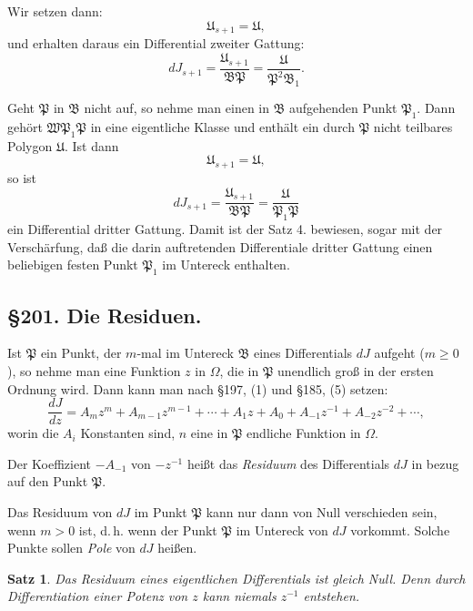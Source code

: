 \documentclass[12pt,a4paper]{article}
\newtheorem*{satz}{Satz}
\begin{document}
Wir setzen dann:
\[
\mathfrak{U}_{s+1} = \mathfrak{U},
\]
und erhalten daraus ein Differential zweiter Gattung:
\begin{equation}\label{eq:200-9}
dJ_{s+1} = \frac{\mathfrak{U}_{s+1}}{\mathfrak{B}\mathfrak{P}} = \frac{\mathfrak{U}}{\mathfrak{P}^2 \mathfrak{B}_1}.
\end{equation}

Geht $\mathfrak{P}$ in $\mathfrak{B}$ nicht auf, so nehme man einen in $\mathfrak{B}$ aufgehenden Punkt $\mathfrak{P}_1$. Dann gehört $\mathfrak{W}\mathfrak{P}_1\mathfrak{P}$ in eine eigentliche Klasse und enthält ein durch $\mathfrak{P}$ nicht teilbares Polygon $\mathfrak{U}$. Ist dann
\[
\mathfrak{U}_{s+1} = \mathfrak{U},
\]
so ist
\begin{equation}\label{eq:200-10}
dJ_{s+1} = \frac{\mathfrak{U}_{s+1}}{\mathfrak{B}\mathfrak{P}} = \frac{\mathfrak{U}}{\mathfrak{P}_1 \mathfrak{P}}
\end{equation}
ein Differential dritter Gattung. Damit ist der Satz 4. bewiesen, sogar mit der Verschärfung, daß die darin auftretenden Differentiale dritter Gattung einen beliebigen festen Punkt $\mathfrak{P}_1$ im Untereck enthalten.

\subsection*{\S 201. Die Residuen.}

Ist $\mathfrak{P}$ ein Punkt, der $m$-mal im Untereck $\mathfrak{B}$ eines Differentials $dJ$ aufgeht ($m \geq 0$), so nehme man eine Funktion $z$ in $\Omega$, die in $\mathfrak{P}$ unendlich groß in der ersten Ordnung wird. Dann kann man nach \S 197, (1) und \S 185, (5) setzen:
\begin{equation}\label{eq:201-1}
\frac{dJ}{dz} = A_m z^m + A_{m-1} z^{m-1} + \cdots + A_1 z + A_0 + A_{-1} z^{-1} + A_{-2} z^{-2} + \cdots,
\end{equation}
worin die $A_i$ Konstanten sind, $n$ eine in $\mathfrak{P}$ endliche Funktion in $\Omega$.

Der Koeffizient $-A_{-1}$ von $-z^{-1}$ heißt das \emph{Residuum} des Differentials $dJ$ in bezug auf den Punkt $\mathfrak{P}$.

Das Residuum von $dJ$ im Punkt $\mathfrak{P}$ kann nur dann von Null verschieden sein, wenn $m > 0$ ist, d.\,h. wenn der Punkt $\mathfrak{P}$ im Untereck von $dJ$ vorkommt. Solche Punkte sollen \emph{Pole} von $dJ$ heißen.

\begin{satz}
Das Residuum eines eigentlichen Differentials ist gleich Null. Denn durch Differentiation einer Potenz von $z$ kann niemals $z^{-1}$ entstehen.
\end{satz}
\end{document}
